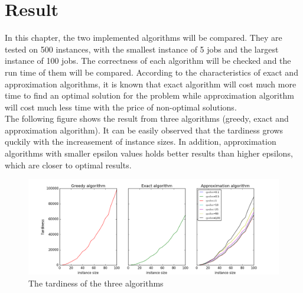 \documentclass[11pt]{article}
\begin{document}
\section {Result}
In this chapter, the two implemented algorithms will be compared. They are tested on 500 instances, with the smallest instance of 5 jobs and the largest instance of 100 jobs. The correctness of each algorithm will be checked and the run time of them will be compared. According to the characteristics of exact and approximation algorithms, it is known that exact algorithm will cost much more time to find an optimal solution for the problem while approximation algorithm will cost much less time with the price of non-optimal solutions.\\
The following figure shows the result from three algorithms (greedy, exact and approximation algorithm). It can be easily observed that the tardiness grows quckily with the increasement of instance sizes. In addition, approximation algorithms with smaller epsilon values holds better results than higher epsilons, which are closer to optimal results.
\begin{figure}[H]
  \centering
    \label{fig:runtime} %
    \includegraphics[width=1.1\textwidth]{three_alg.png}
	\caption{The tardiness of the three algorithms}
\end{figure}
\end{document}
